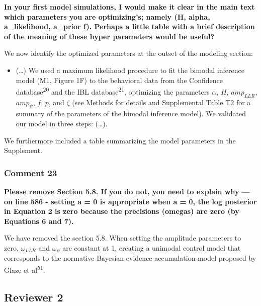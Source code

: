 \documentclass[
]{article}
\providecommand{\tightlist}{%
  \setlength{\itemsep}{0pt}\setlength{\parskip}{0pt}}
\begin{document}
\textbf{In your first model simulations, I would make it clear in the
main text which parameters you are optimizing's; namely (H, alpha,
a\_likelihood, a\_prior f). Perhaps a little table with a brief
description of the meaning of these hyper parameters would be useful?}

We now identify the optimized parameters at the outset of the modeling
section:

\begin{itemize}
\tightlist
\item
  (\ldots) We used a maximum likelihood procedure to fit the bimodal
  inference model (M1, Figure 1F) to the behavioral data from the
  Confidence database\textsuperscript{20} and the IBL
  database\textsuperscript{21}, optimizing the parameters \(\alpha\),
  \(H\), \(amp_{LLR}\), \(amp_{\psi}\), \(f\), \(p\), and \(\zeta\) (see
  Methods for details and Supplemental Table T2 for a summary of the
  parameters of the bimodal inference model). We validated our model in
  three steps: (\ldots).
\end{itemize}

We furthermore included a table summarizing the model parameters in the
Supplement.

\hypertarget{comment-23}{%
\subsubsection{Comment 23}\label{comment-23}}

\textbf{Please remove Section 5.8. If you do not, you need to explain
why --- on line 586 - setting a = 0 is appropriate when a = 0, the log
posterior in Equation 2 is zero because the precisions (omegas) are zero
(by Equations 6 and 7).}

We have removed the section 5.8. When setting the amplitude parameters
to zero, \(\omega_{LLR}\) and \(\omega_{\psi}\) are constant at 1,
creating a unimodal control model that corresponds to the normative
Bayesian evidence accumulation model proposed by Glaze et
al\textsuperscript{51}.

\hypertarget{reviewer-2}{%
\subsection{Reviewer 2}\label{reviewer-2}}
\end{document}
